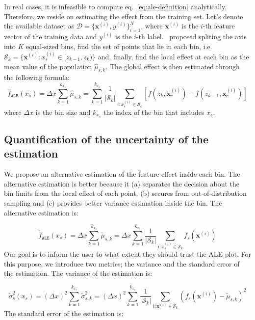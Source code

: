 \documentclass[wcp]{jmlr}
\newcommand{\xii}{\mathbf{x}^{(i)}}
\newcommand{\xsi}{x_s^{(i)}}
\newcommand{\xci}{\mathbf{x}_c^{(i)}}
\newcommand{\yi}{y^{(i)}}
\newcommand{\1}{\mathbbm{1}}
\newcommand{\D}{\mathcal{D}}
\begin{document}
In real cases, it is infeasible to compute
eq.~\eqref{eq:ale-definition} analytically. Therefore, we reside on
estimating the effect from the training set. Let's denote the
available dataset as \(\D = \{\xii, \yi \}_{i=1}^N\), where \( \xii \)
is the \(i\)-th feature vector of the training data and \(\yi\) is the
\(i\)-th label.~\cite{Apley2020} proposed spliting the axis into
\( K \) equal-sized bins, find the set of points that lie in each bin,
i.e.  \( \mathcal{S}_k = \{ \xii : x_s^{(i)} \in [z_{k-1}, z_k) \} \)
and, finally, find the local effect at each bin as the mean value of
the population \(\hat{\mu}_{s,k}\). The global effect is then
estimated through the following formula:
%
\begin{equation}
  \label{eq:ale-approximation}
  \hat{f}_{\mathtt{ALE}}(x_s)
  = \Delta x \sum_{k=1}^{k_{x_s}} \hat{\mu}_{s,k}
  = \sum_{k=1}^{k_{x_s}} \frac{1}{|\mathcal{S}_k|} \sum_{i:\xsi \in \mathcal{S}_k} [f(z_k, \xci) - f(z_{k-1}, \xci)]
\end{equation}
%
where \(\Delta x\) is the bin size and \(k_{x_s}\) the index of the
bin that includes \(x_s\).
%

\subsection{Quantification of the uncertainty of the estimation}

We propose an alternative estimation of the feature effect inside each
bin. The alternative estimation is better because it (a) separates the
decision about the bin limits from the local effect of each point, (b)
secures from out-of-distribution sampling and (c) provides better
variance estimation inside the bin. The alternative estimation is:

\begin{equation}
  \label{eq:1}
  \tilde{f}_{\texttt{ALE}}(x_s) =
  \Delta x \sum_{k=1}^{k_{x_s}} \tilde{\mu}_{s,k} =
  \Delta x \sum_{k=1}^{k_{x_s}} \frac{1}{|\mathcal{S}_k|} \sum_{i:\xsi \in \mathcal{S}_k} f_s(\xii)
\end{equation}
%
Our goal is to inform the user to what extent they should trust the
ALE plot. For this purpose, we introduce two metrics; the variance and
the standard error of the estimation. The variance of the estimation
is:

\begin{equation}
  \label{eq:effect-var-approx}
  \tilde{\sigma}_s^2(x_s)
  = (\Delta x)^2 \sum_{k=1}^{k_{x_s}} \tilde{\sigma}_{s,k}^2
  = (\Delta x)^2 \sum_{k=1}^{k_{x_s}} \frac{1}{|\mathcal{S}_k|} \sum_{i:\xii \in \mathcal{S}_k} (f_s(\xii) - \tilde{\mu}_{s,k})^2 
\end{equation}
%
The standard error of the estimation is:
\end{document}
